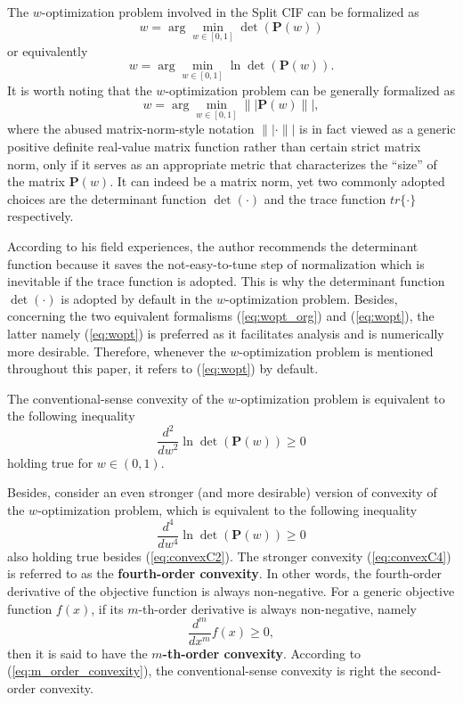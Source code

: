 \documentclass[12pt]{article}
\begin{document}
The $w$-optimization problem involved in the Split CIF \cite{Li2013a} can be formalized as
\begin{equation}  \label{eq:wopt_org}
w = \arg \min_{w \in [0,1]} \det(\mathbf{P}(w))
\end{equation}
or equivalently
\begin{equation}  \label{eq:wopt}
w = \arg \min_{w \in [0,1]} \ln \det(\mathbf{P}(w)).
\end{equation}
It is worth noting that the $w$-optimization problem can be generally formalized as
\begin{equation}  \label{eq:wopt_general}
w = \arg \min_{w \in [0,1]} \|| \mathbf{P}(w) \||,
\end{equation}
where the abused matrix-norm-style notation $\|| \cdot \||$ is in fact viewed as a generic positive definite real-value matrix function rather than certain strict matrix norm, only if it serves as an appropriate metric that characterizes the ``size'' of the matrix $\mathbf{P}(w)$. It can indeed be a matrix norm, yet two commonly adopted choices are the determinant function $\det(\cdot)$ and the trace function $tr \{ \cdot \}$ respectively. 

According to his field experiences, the author recommends the determinant function because it saves the not-easy-to-tune step of normalization which is inevitable if the trace function is adopted. This is why the determinant function $\det(\cdot)$ is adopted by default in the $w$-optimization problem. Besides, concerning the two equivalent formalisms (\ref{eq:wopt_org}) and (\ref{eq:wopt}), the latter namely (\ref{eq:wopt}) is preferred as it facilitates analysis and is numerically more desirable. Therefore, whenever the $w$-optimization problem is mentioned throughout this paper, it refers to (\ref{eq:wopt}) by default.

The conventional-sense convexity of the $w$-optimization problem is equivalent to the following inequality
\begin{equation} \label{eq:convexC2}
\frac{d^2}{dw^2} \ln \det(\mathbf{P}(w)) \geq 0
\end{equation}
holding true for $w \in (0,1)$.

Besides, consider an even stronger (and more desirable) version of convexity of the $w$-optimization problem, which is equivalent to the following inequality
\begin{equation} \label{eq:convexC4}
\frac{d^4}{dw^4} \ln \det(\mathbf{P}(w)) \geq 0
\end{equation}
also holding true besides (\ref{eq:convexC2}). The stronger convexity (\ref{eq:convexC4}) is referred to as the \textbf{fourth-order convexity}. In other words, the fourth-order derivative of the objective function is always non-negative. For a generic objective function $f(x)$, if its $m$-th-order derivative is always non-negative, namely
\begin{equation}  \label{eq:m_order_convexity}
\frac{d^m}{dx^m} f(x) \geq 0,
\end{equation}
then it is said to have the \textbf{$m$-th-order convexity}. According to (\ref{eq:m_order_convexity}), the conventional-sense convexity is right the second-order convexity.
\end{document}

